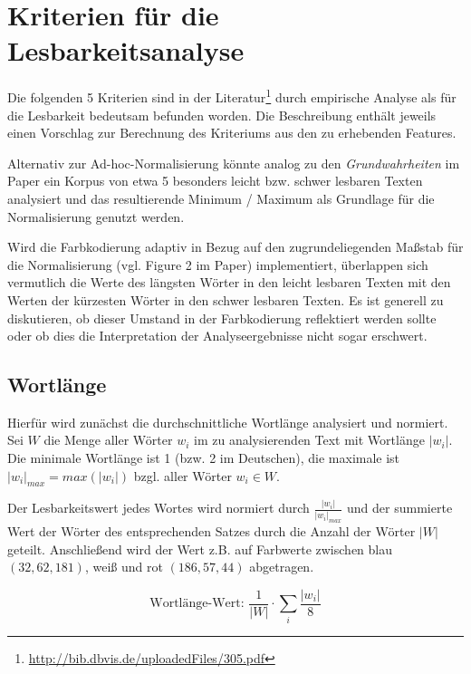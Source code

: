 \documentclass[10pt,a4paper]{article}
\begin{document}
	\section*{Kriterien für die Lesbarkeitsanalyse}
	Die folgenden 5 Kriterien sind in der Literatur\footnote{\url{http://bib.dbvis.de/uploadedFiles/305.pdf}} durch empirische Analyse als für die Lesbarkeit bedeutsam befunden worden. Die Beschreibung enthält jeweils einen Vorschlag zur Berechnung des Kriteriums aus den zu erhebenden Features. 
	
	Alternativ zur Ad-hoc-Normalisierung könnte analog zu den \textit{Grundwahrheiten} im Paper ein Korpus von etwa 5 besonders leicht bzw. schwer lesbaren Texten analysiert und das resultierende Minimum / Maximum als Grundlage für die Normalisierung genutzt werden. 
	
	Wird die Farbkodierung adaptiv in Bezug auf den zugrundeliegenden Maßstab für die Normalisierung (vgl. Figure 2 im Paper) implementiert, überlappen sich vermutlich die Werte des längsten Wörter in den leicht lesbaren Texten mit den Werten der kürzesten Wörter in den schwer lesbaren Texten. Es ist generell zu diskutieren, ob dieser Umstand in der Farbkodierung reflektiert werden sollte oder ob dies die Interpretation der Analyseergebnisse nicht sogar erschwert.
	
	\subsection*{Wortlänge}
	Hierfür wird zunächst die durchschnittliche Wortlänge analysiert und normiert. 
	Sei $ W $ die Menge aller Wörter $ w_i $ im zu analysierenden Text mit Wortlänge $ |w_i| $. Die minimale Wortlänge ist 1 (bzw. 2 im Deutschen), die maximale ist $ |w_i|_{max}=max(|w_i|) $ bzgl. aller Wörter $ w_i\in W $. 
	
	Der Lesbarkeitswert jedes Wortes wird normiert durch $ \frac{|w_i|}{|w_i|_{max}}$ und der summierte Wert der Wörter des entsprechenden Satzes durch die Anzahl der Wörter $ |W| $ geteilt. Anschließend wird der Wert z.B. auf Farbwerte zwischen blau $ (32,62,181) $, weiß und rot $ (186,57,44) $ abgetragen.
		
	\begin{equation*}
		\text{Wortlänge-Wert: }\frac{1}{|W|}\cdot\sum\limits_i \frac{|w_i|}{8}
	\end{equation*}
		
\end{document}
